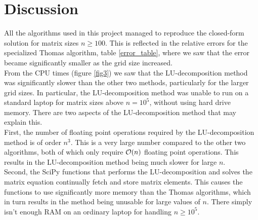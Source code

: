 \documentclass[notitlepage, reprint, nofootinbib]{revtex4-1}
\begin{document}
\section{Discussion}
All the algorithms used in this project managed to reproduce the closed-form solution for matrix sizes $n\geq 100$. This is reflected in the relative errors for the specialized Thomas algorithm, table \ref{error_table}, where we saw that the error became significantly smaller as the grid size increased. \\[2mm]
From the CPU times (figure \ref{fig3}) we saw that the LU-decomposition method was significantly slower than the other two methods, particularly for the larger grid sizes. In particular, the LU-decomposition method was unable to run on a standard laptop for matrix sizes above $n=10^5$, without using hard drive memory. There are two aspects of the LU-decomposition method that may explain this.\\[2mm]
First, the number of floating point operations required by the LU-decomposition method is of order $n^3$\cite{lecture_notes}. This is a very large number compared to the other two algorithms, both of which only require $\order{n}$ floating point operations. This results in the LU-decomposition method being much slower for large $n$.\\[2mm]
Second, the SciPy functions that performs the LU-decomposition and solves the matrix equation continually fetch and store matrix elements. This causes the functions to use significantly more memory than the Thomas algorithms, which in turn results in the method being unusable for large values of $n$. There simply isn't enough RAM on an ordinary laptop for handling $n\geq10^5$. 
\onecolumngrid 
\clearpage
\end{document}
